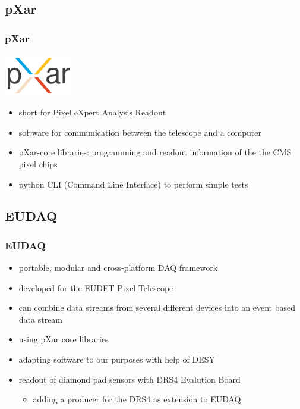 \documentclass[9pt]{beamer}
\begin{document}
\subsection{pXar}
\begin{frame}
	\frametitle{pXar}
	\begin{center}
		\includegraphics[width=3cm]{Pics/pxar_logo}
	\end{center}
	\begin{itemize}
		\item short for Pixel eXpert Analysis Readout
		\item software for communication between the telescope and a computer
		\item pXar-core libraries: programming and readout information of the the CMS pixel chips
		\item python CLI (Command Line Interface) to perform simple tests
	\end{itemize}
\end{frame}
\subsection{EUDAQ}
\begin{frame}
	\frametitle{EUDAQ}
	\begin{itemize}
		\item portable, modular and cross-platform DAQ framework
		\item developed for the EUDET Pixel Telescope
		\item can combine data streams from several different devices into an event based data stream
		\item using pXar core libraries
		\item adapting software to our purposes with help of DESY
		\vspace*{1cm}
		\item readout of diamond pad sensors with DRS4 Evalution Board
		\begin{itemize}
			\item adding a producer for the DRS4 as extension to EUDAQ
		\end{itemize}
	\end{itemize}
\end{frame}
\end{document}
